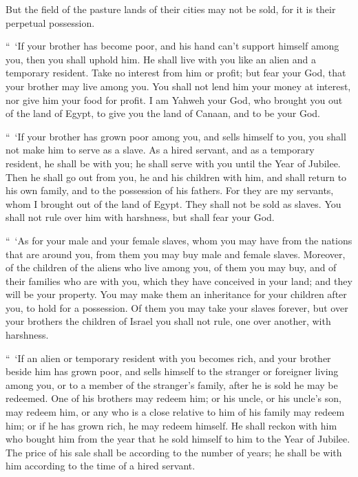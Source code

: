 {But the field of the pasture lands of their cities may not be sold, for it is their perpetual possession.
\par }{\PP {}“ ‘If your brother has become poor, and his hand can’t support himself among you, then you shall uphold him. He shall live with you like an alien and a temporary resident.
Take no interest from him or profit; but fear your God, that your brother may live among you.
You shall not lend him your money at interest, nor give him your food for profit.
I am Yahweh your God, who brought you out of the land of Egypt, to give you the land of Canaan, and to be your God.
\par }{\PP {}“ ‘If your brother has grown poor among you, and sells himself to you, you shall not make him to serve as a slave.
As a hired servant, and as a temporary resident, he shall be with you; he shall serve with you until the Year of Jubilee.
Then he shall go out from you, he and his children with him, and shall return to his own family, and to the possession of his fathers.
For they are my servants, whom I brought out of the land of Egypt. They shall not be sold as slaves.
You shall not rule over him with harshness, but shall fear your God.
\par }{\PP {}“ ‘As for your male and your female slaves, whom you may have from the nations that are around you, from them you may buy male and female slaves.
Moreover, of the children of the aliens who live among you, of them you may buy, and of their families who are with you, which they have conceived in your land; and they will be your property.
You may make them an inheritance for your children after you, to hold for a possession. Of them you may take your slaves forever, but over your brothers the children of Israel you shall not rule, one over another, with harshness.
\par }{\PP {}“ ‘If an alien or temporary resident with you becomes rich, and your brother beside him has grown poor, and sells himself to the stranger or foreigner living among you, or to a member of the stranger’s family,
after he is sold he may be redeemed. One of his brothers may redeem him;
or his uncle, or his uncle’s son, may redeem him, or any who is a close relative to him of his family may redeem him; or if he has grown rich, he may redeem himself.
He shall reckon with him who bought him from the year that he sold himself to him to the Year of Jubilee. The price of his sale shall be according to the number of years; he shall be with him according to the time of a hired servant.
}
